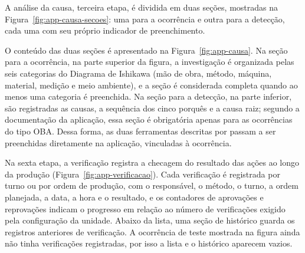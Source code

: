 
A análise da causa, terceira etapa, é dividida em duas seções, mostradas na Figura~\ref{fig:app-causa-secoes}: uma para a ocorrência e outra para a detecção, cada uma com seu próprio indicador de preenchimento.


O conteúdo das duas seções é apresentado na Figura~\ref{fig:app-causa}. Na seção para a ocorrência, na parte superior da figura, a investigação é organizada pelas seis categorias do Diagrama de Ishikawa (mão de obra, método, máquina, material, medição e meio ambiente), e a seção é considerada completa quando ao menos uma categoria é preenchida. Na seção para a detecção, na parte inferior, são registradas as causas, a sequência dos cinco porquês e a causa raiz; segundo a documentação da aplicação, essa seção é obrigatória apenas para as ocorrências do tipo OBA. Dessa forma, as duas ferramentas descritas por  passam a ser preenchidas diretamente na aplicação, vinculadas à ocorrência.


Na sexta etapa, a verificação registra a checagem do resultado das ações ao longo da produção (Figura~\ref{fig:app-verificacao}). Cada verificação é registrada por turno ou por ordem de produção, com o responsável, o método, o turno, a ordem planejada, a data, a hora e o resultado, e os contadores de aprovações e reprovações indicam o progresso em relação ao número de verificações exigido pela configuração da unidade. Abaixo da lista, uma seção de histórico guarda os registros anteriores de verificação. A ocorrência de teste mostrada na figura ainda não tinha verificações registradas, por isso a lista e o histórico aparecem vazios.

